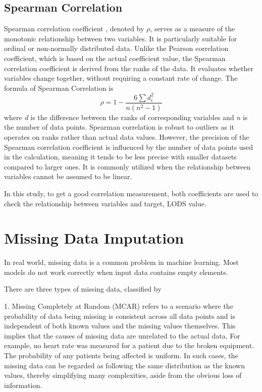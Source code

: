 \documentclass[12pt,a4paper,english
]{tunithesis}
\begin{document}
\subsection{Spearman Correlation}
Spearman correlation coefficient \parencite{acuk2023, Schober2018}, denoted by \(\rho\), serves as a measure of the monotonic relationship between two variables. It is particularly suitable for ordinal or non-normally distributed data. Unlike the Pearson correlation coefficient, which is based on the actual coefficient value, the Spearman correlation coefficient is derived from the ranks of the data. It evaluates whether variables change together, without requiring a constant rate of change. The formula of Spearman Correlation is
\begin{equation}
    \rho = 1- {\frac {6 \sum d_i^2}{n(n^2 - 1)}}
\end{equation}
where \textit{d} is the difference between the ranks of corresponding variables and \textit{n} is the number of data points. Spearman correlation is robust to outliers as it operates on ranks rather than actual data values. However, the precision of the Spearman correlation coefficient is influenced by the number of data points used in the calculation, meaning it tends to be less precise with smaller datasets compared to larger ones. It is commonly utilized when the relationship between variables cannot be assumed to be linear.

In this study, to get a good correlation measurement, both coefficients are used to check the relationship between variables and target, LODS value.

\section{Missing Data Imputation}
In real world, missing data is a common problem in machine learning. Most models do not work correctly when input data contains empty elements.

There are three types of missing data, classified by \textcite{rubin1976}

1. Missing Completely at Random (MCAR) refers to a scenario where the probability of data being missing is consistent across all data points and is independent of both known values and the missing values themselves. This implies that the causes of missing data are unrelated to the actual data. For example, no heart rate was measured for a patient due to the broken equipment. The probability of any patients being affected is uniform. In such cases, the missing data can be regarded as following the same distribution as the known values, thereby simplifying many complexities, aside from the obvious loss of information.
\end{document}
